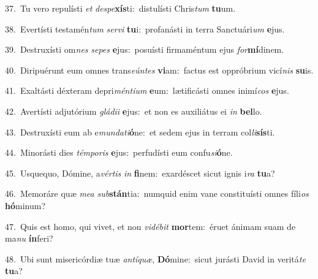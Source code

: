 {\numbfont\textcolor{\numbcolor}{37.}}~Tu vero repulísti \textit{et} \textit{de}\-\textit{spe}\textbf{xís}ti:~\star distulísti Chris\textit{tum} \textbf{tu}\-um.\par
{\numbfont\textcolor{\numbcolor}{38.}}~Evertísti testamén\textit{tum} \textit{ser}\-\textit{vi} \textbf{tu}\-i:~\star profanásti in terra Sanctuári\textit{um} \textbf{e}\-jus.\par
{\numbfont\textcolor{\numbcolor}{39.}}~Destruxísti om\textit{nes} \textit{se}\-\textit{pes} \textbf{e}\-jus:~\star posuísti firmaméntum ejus \textit{for}\-\textbf{mí}dinem.\par
{\numbfont\textcolor{\numbcolor}{40.}}~Diripuérunt eum omnes trans\-\textit{e}\-\textit{ún}\textit{tes} \textbf{vi}\-am:~\star factus est oppróbrium vicí\textit{nis} \textbf{su}\-is.\par
{\numbfont\textcolor{\numbcolor}{41.}}~Exaltásti déxteram depri\-\textit{mén}\-\textit{ti}\textit{um} \textbf{e}\-um:~\star lætificásti omnes inimí\textit{cos} \textbf{e}\-jus.\par
{\numbfont\textcolor{\numbcolor}{42.}}~Avertísti adjutórium \textit{glá}\-\textit{di}\textit{i} \textbf{e}\-jus:~\star et non es auxiliátus ei \textit{in} \textbf{bel}\-lo.\par
{\numbfont\textcolor{\numbcolor}{43.}}~Destruxísti eum ab e\-\textit{mun}\-\textit{da}\textit{ti}\textbf{ó}ne:~\star et sedem ejus in terram col\-\textit{li}\-\textbf{sís}ti.\par
{\numbfont\textcolor{\numbcolor}{44.}}~Minorásti dies \textit{tém}\-\textit{po}\textit{ris} \textbf{e}\-jus:~\star perfudísti eum confu\-\textit{si}\-\textbf{ó}ne.\par
{\numbfont\textcolor{\numbcolor}{45.}}~Usquequo, Dómine, a\-\textit{vér}\-\textit{tis} \textit{in} \textbf{fi}\-nem:~\star exardéscet sicut ignis i\textit{ra} \textbf{tu}\-a?\par
{\numbfont\textcolor{\numbcolor}{46.}}~Memoráre quæ \textit{me}\-\textit{a} \textit{sub}\-\textbf{stán}tia:~\star numquid enim vane constituísti omnes fíli\textit{os} \textbf{hó}\-minum?\par
{\numbfont\textcolor{\numbcolor}{47.}}~Quis est homo, qui vivet, et non \textit{vi}\-\textit{dé}\textit{bit} \textbf{mor}\-tem:~\star éruet ánimam suam de ma\textit{nu} \textbf{ín}\-feri?\par
{\numbfont\textcolor{\numbcolor}{48.}}~Ubi sunt misericórdiæ tuæ \textit{an}\-\textit{tí}\textit{quæ}, \textbf{Dó}\-mine:~\star sicut jurásti David in veritá\textit{te} \textbf{tu}\-a?\par
